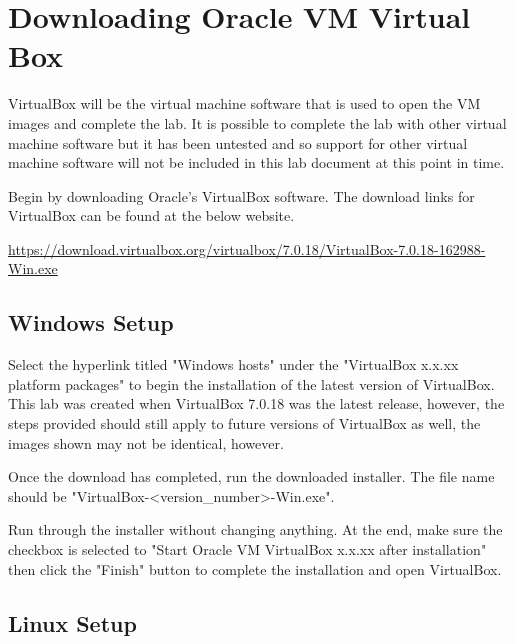 \documentclass[letterpaper,12pt]{report}
\begin{document}
\clearpage
{}
\settableofcontents
\tableofcontents
\clearpage


\section*{Downloading Oracle VM Virtual Box}\label{sec:overview}

VirtualBox will be the virtual machine software that is used to open the VM images and complete the lab. It is possible to complete the lab with other virtual machine software but it has been untested and so support for other virtual machine software will not be included in this lab document at this point in time.

Begin by downloading Oracle's VirtualBox software. The download links for VirtualBox can be found at the below website.

\url{https://download.virtualbox.org/virtualbox/7.0.18/VirtualBox-7.0.18-162988-Win.exe}

\subsection*{Windows Setup}\label{sec:Virtual-Machine-Windows-Setup}

Select the hyperlink titled "Windows hosts" under the "VirtualBox x.x.xx platform packages" to begin the installation of the latest version of VirtualBox. This lab was created when VirtualBox 7.0.18 was the latest release, however, the steps provided should still apply to future versions of VirtualBox as well, the images shown may not be identical, however.

Once the download has completed, run the downloaded installer. The file name should be "VirtualBox-<version\_number>-Win.exe".

Run through the installer without changing anything. At the end, make sure the checkbox is selected to "Start Oracle VM VirtualBox x.x.xx after installation" then click the "Finish" button to complete the installation and open VirtualBox.

\subsection*{Linux Setup}\label{sec:Virtual-Machine-Linux-Setup}
\end{document}
